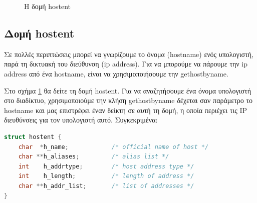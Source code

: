 \begin{figure}[!h]
	\centering
	\caption{Η δομή hostent}
	\label{hostent}
\end{figure} 





%


\subsection*{Δομή hostent}

Σε πολλές περιπτώσεις μπορεί να γνωρίζουμε το όνομα (hostname) ενός υπολογιστή, παρά τη δικτυακή του διεύθυνση (ip address). Για να μπορούμε να πάρουμε την ip address από ένα hostname, είναι να χρησιμοποιήσουμε την gethostbyname.

Στο σχήμα \ref{hostent} θα δείτε τη δομή hostent. Για να αναζητήσουμε ένα όνομα υπολογιστή στο διαδίκτυο, χρησιμοποιούμε την κλήση
gethostbyname δέχεται σαν παράμετρο το hostname και μας επιστρέφει έναν δείκτη σε αυτή τη δομή, η οποία περιέχει τις IP διευθύνσεις για τον υπολογιστή αυτό.
Συγκεκριμένα:

\begin{lstlisting}[language=C,breaklines=true, basicstyle=\scriptsize\ttfamily]
struct hostent {
	char  *h_name;            /* official name of host */
	char **h_aliases;         /* alias list */
	int    h_addrtype;        /* host address type */
	int    h_length;          /* length of address */
	char **h_addr_list;       /* list of addresses */
}
\end{lstlisting}




